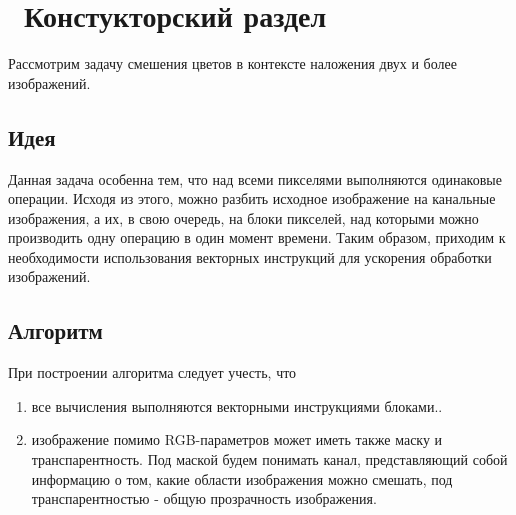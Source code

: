 \chapter{ Констукторский раздел}
\label{cha:design}
 Рассмотрим задачу смешения цветов в контексте наложения двух и более изображений.
 
  \section{Идея}
 Данная задача особенна тем, что над всеми пикселями выполняются одинаковые операции. Исходя из этого, можно разбить исходное изображение на канальные изображения, а их, в свою очередь, на блоки пикселей, над которыми можно производить одну операцию в один момент времени. Таким образом, приходим к необходимости использования векторных инструкций для ускорения обработки изображений.

 \section{Алгоритм }
 При построении алгоритма следует учесть, что 
 \begin{enumerate}
 	\item все вычисления выполняются векторными инструкциями блоками..
 	\item изображение помимо RGB-параметров может иметь также маску и транспарентность. Под маской будем понимать канал, представляющий собой информацию о том, какие области изображения можно смешать, под транспарентностью - общую прозрачность изображения.
\end{enumerate}

